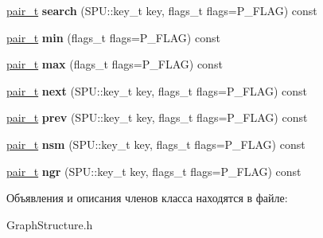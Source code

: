 \begin{DoxyCompactItemize}
\mbox{\label{class_s_p_u___g_r_a_p_h_1_1_graph_structure_a2b25832c46aee724f5a91b32cbe5971b}} 
\hyperlink{struct_s_p_u_1_1pair__containter}{pair\+\_\+t} {\bfseries search} (S\+P\+U\+::key\+\_\+t key, flags\+\_\+t flags=P\+\_\+\+F\+L\+AG) const
\item 
\mbox{\label{class_s_p_u___g_r_a_p_h_1_1_graph_structure_ab9adcc555bb778d96d5e70cefdf48198}} 
\hyperlink{struct_s_p_u_1_1pair__containter}{pair\+\_\+t} {\bfseries min} (flags\+\_\+t flags=P\+\_\+\+F\+L\+AG) const
\item 
\mbox{\label{class_s_p_u___g_r_a_p_h_1_1_graph_structure_acfd4c9bb9d07d1e5daf4de3d159fad10}} 
\hyperlink{struct_s_p_u_1_1pair__containter}{pair\+\_\+t} {\bfseries max} (flags\+\_\+t flags=P\+\_\+\+F\+L\+AG) const
\item 
\mbox{\label{class_s_p_u___g_r_a_p_h_1_1_graph_structure_a089e2778b479b47b709bafdb16f71e7b}} 
\hyperlink{struct_s_p_u_1_1pair__containter}{pair\+\_\+t} {\bfseries next} (S\+P\+U\+::key\+\_\+t key, flags\+\_\+t flags=P\+\_\+\+F\+L\+AG) const
\item 
\mbox{\label{class_s_p_u___g_r_a_p_h_1_1_graph_structure_ac3d52277ac2153404de9b9c6e6e6cef6}} 
\hyperlink{struct_s_p_u_1_1pair__containter}{pair\+\_\+t} {\bfseries prev} (S\+P\+U\+::key\+\_\+t key, flags\+\_\+t flags=P\+\_\+\+F\+L\+AG) const
\item 
\mbox{\label{class_s_p_u___g_r_a_p_h_1_1_graph_structure_a4132720a0585b471da3d7e67628f0360}} 
\hyperlink{struct_s_p_u_1_1pair__containter}{pair\+\_\+t} {\bfseries nsm} (S\+P\+U\+::key\+\_\+t key, flags\+\_\+t flags=P\+\_\+\+F\+L\+AG) const
\item 
\mbox{\label{class_s_p_u___g_r_a_p_h_1_1_graph_structure_a2dc44fa2e81cf9740b34c81a11f3b854}} 
\hyperlink{struct_s_p_u_1_1pair__containter}{pair\+\_\+t} {\bfseries ngr} (S\+P\+U\+::key\+\_\+t key, flags\+\_\+t flags=P\+\_\+\+F\+L\+AG) const
\end{DoxyCompactItemize}


Объявления и описания членов класса находятся в файле\+:\begin{DoxyCompactItemize}
\item 
Graph\+Structure.\+h\end{DoxyCompactItemize}
